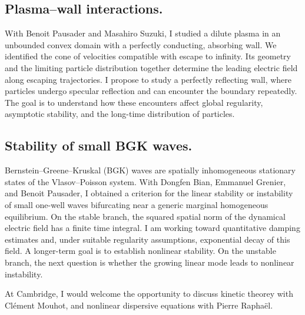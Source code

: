 \documentclass[reqno,10pt,a4paper]{amsart}
\numberwithin{equation}{section}
\begin{document}
\subsection*{Plasma--wall interactions.}
With Benoit Pausader and Masahiro Suzuki, I studied a dilute plasma in an unbounded convex domain with a perfectly conducting, absorbing wall. We identified the cone of velocities compatible with escape to infinity. Its geometry and the limiting particle distribution together determine the leading electric field along escaping trajectories. I propose to study a perfectly reflecting wall, where particles undergo specular reflection and can encounter the boundary repeatedly. The goal is to understand how these encounters affect global regularity, asymptotic stability, and the long-time distribution of particles.

\subsection*{Stability of small BGK waves.}
Bernstein--Greene--Kruskal (BGK) waves are spatially inhomogeneous stationary states of the Vlasov--Poisson system. With Dongfen Bian, Emmanuel Grenier, and Benoit Pausader, I obtained a criterion for the linear stability or instability of small one-well waves bifurcating near a generic marginal homogeneous equilibrium. On the stable branch, the squared spatial norm of the dynamical electric field has a finite time integral. I am working toward quantitative damping estimates and, under suitable regularity assumptions, exponential decay of this field. A longer-term goal is to establish nonlinear stability. On the unstable branch, the next question is whether the growing linear mode leads to nonlinear instability.

At Cambridge, I would welcome the opportunity to discuss kinetic theorey with Cl\'ement Mouhot, and nonlinear dispersive equations with Pierre Rapha\"el.
\end{document}
